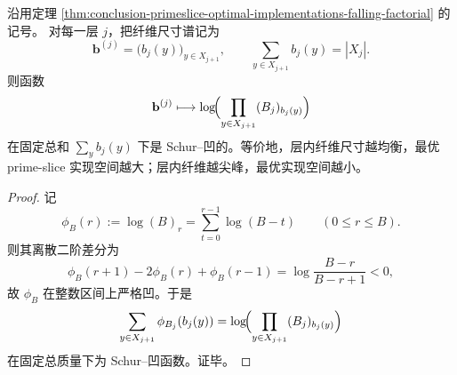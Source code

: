 \begin{corollary}\label{cor:conclusion-primeslice-optimal-implementation-schur-concavity}
沿用定理 \ref{thm:conclusion-primeslice-optimal-implementations-falling-factorial} 的记号。
对每一层 \(j\)，把纤维尺寸谱记为
\[
\mathbf b^{(j)}=\bigl(b_j(y)\bigr)_{y\in X_{j+1}},
\qquad
\sum_{y\in X_{j+1}}b_j(y)=|X_j|.
\]
则函数
\[
\mathbf b^{(j)}
\longmapsto
\log\!\Bigl(\prod_{y\in X_{j+1}}(B_j)_{b_j(y)}\Bigr)
\]
在固定总和 \(\sum_y b_j(y)\) 下是 Schur--凹的。等价地，层内纤维尺寸越均衡，最优 prime-slice 实现空间越大；层内纤维越尖峰，最优实现空间越小。
\end{corollary}
\begin{proof}
记
\[
\phi_B(r):=\log(B)_r=\sum_{t=0}^{r-1}\log(B-t)
\qquad(0\le r\le B).
\]
则其离散二阶差分为
\[
\phi_B(r+1)-2\phi_B(r)+\phi_B(r-1)
=
\log\frac{B-r}{B-r+1}<0,
\]
故 \(\phi_B\) 在整数区间上严格凹。于是
\[
\sum_{y\in X_{j+1}}\phi_{B_j}(b_j(y))
=
\log\!\Bigl(\prod_{y\in X_{j+1}}(B_j)_{b_j(y)}\Bigr)
\]
在固定总质量下为 Schur--凹函数。证毕。
\end{proof}

